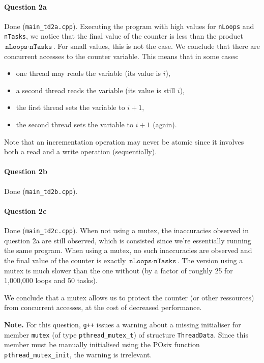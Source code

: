 \documentclass[a4paper,oneside,11pt]{article}
\begin{document}
\paragraph{Question 2a} Done (\texttt{main\_td2a.cpp}). Executing the program with high values for \texttt{nLoops} and \texttt{nTasks}, we notice that the final value of the counter is less than the product $\texttt{nLoops}\cdot\texttt{nTasks}$. For small values, this is not the case. We conclude that there are concurrent accesses to the counter variable. This means that in some cases:
\begin{itemize}
  \item  one thread may reads the variable (its value is $i$),
  \item a second thread reads the variable (its value is still $i$),
  \item the first thread sets the variable to $i+1$,
  \item the second thread sets the variable to $i+1$ (again).
\end{itemize}

Note that an incrementation operation may never be atomic since it involves both a read and a write operation (sequentially).

\paragraph{Question 2b} Done (\texttt{main\_td2b.cpp}).

\paragraph{Question 2c} Done (\texttt{main\_td2c.cpp}). When not using a mutex, the inaccuracies observed in question 2a are still observed, which is consisted since we're essentially running the same program. When using a mutex, no such inaccuracies are observed and the final value of the counter is exactly $\texttt{nLoops}\cdot\texttt{nTasks}$. The version using a mutex is much slower than the one without (by a factor of roughly 25 for 1,000,000 loops and 50 tasks).

We conclude that a mutex allows us to protect the counter (or other ressources) from concurrent accesses, at the cost of decreased performance.

\textbf{Note.} For this question, \texttt{g++} issues a warning about a missing initialiser for member \texttt{mutex} (of type \texttt{pthread\_mutex\_t}) of structure \texttt{ThreadData}. Since this member must be manually initialised using the POsix function \texttt{pthread\_mutex\_init}, the warning is irrelevant.
\end{document}
